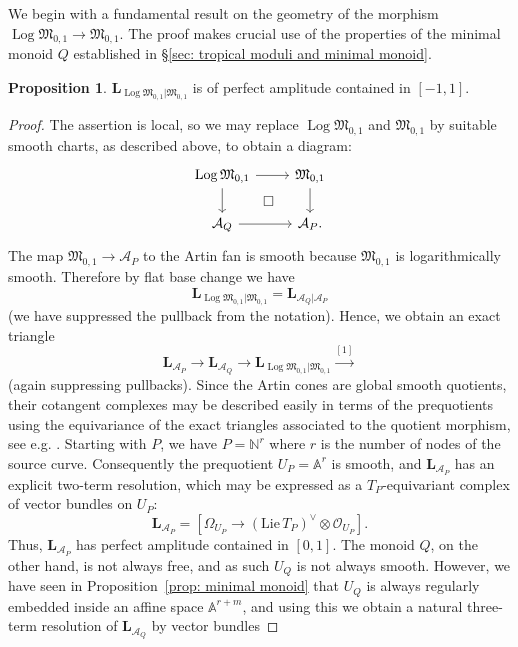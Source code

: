 \documentclass[11pt]{amsart}
\theoremstyle{definition}
\theoremstyle{definition}
\newtheorem{proposition}[theorem]{Proposition}
\newcommand{\LL}{\mathbf{L}}
\newcommand{\Aaff}{\mathbb{A}}
\newcommand{\OO}{\mathcal{O}}
\newcommand{\N}{\mathbb{N}}
\newcommand{\Acal}{\mathcal{A}}
\newcommand{\Mfrak}{\mathfrak{M}}
\newcommand{\Log}{\operatorname{Log}}
\begin{document}
We begin with a fundamental result on the geometry of the morphism $\Log\Mfrak_{0,1} \to \Mfrak_{0,1}$. The proof makes crucial use of the properties of the minimal monoid $Q$ established in \S \ref{sec: tropical moduli and minimal monoid}.

\begin{proposition} \label{prop: Lchi in -1,1} $\LL_{\Log\Mfrak_{0,1}|\Mfrak_{0,1}}$ is of perfect amplitude contained in $[-1,1]$.\end{proposition}
\begin{proof} The assertion is local, so we may replace $\Log\Mfrak_{0,1}$ and $\Mfrak_{0,1}$ by suitable smooth charts, as described above, to obtain a diagram:
\begin{equation}
\begin{tikzcd}
\Log\Mfrak_{0,1} \ar[r] \ar[d] \ar[rd,phantom,"\square"] & \Mfrak_{0,1} \ar[d] \\
\Acal_Q \ar[r] & \Acal_P.
\end{tikzcd}	
\end{equation}
The map $\Mfrak_{0,1} \to \Acal_P$ to the Artin fan is smooth because $\Mfrak_{0,1}$ is logarithmically smooth. Therefore by flat base change we have
$$\LL_{\Log\Mfrak_{0,1}|\Mfrak_{0,1}} = \LL_{\Acal_Q|\Acal_P}$$
(we have suppressed the pullback from the notation). Hence, we obtain an exact triangle
\begin{equation}\label{eqn: exact triangle for Lchi} \LL_{\Acal_P} \to \LL_{\Acal_Q} \to \LL_{\Log\Mfrak_{0,1}|\Mfrak_{0,1}} \xrightarrow{[1]}\end{equation}
(again suppressing pullbacks). Since the Artin cones are global smooth quotients, their cotangent complexes may be described easily in terms of the prequotients using the equivariance of the exact triangles associated to the quotient morphism, see e.g. \cite[p.4]{BehrendDeRham}. Starting with $P$, we have $P=\N^r$ where $r$ is the number of nodes of the source curve. Consequently the prequotient $U_P = \Aaff^r$ is smooth, and $\LL_{\Acal_P}$ has an explicit two-term resolution, which may be expressed as a $T_P$-equivariant complex of vector bundles on $U_P$:
\begin{equation*} \LL_{\Acal_P} = [ \Omega_{U_P} \to (\mathrm{Lie}\, T_P)^\vee \otimes \OO_{U_P} ].\end{equation*}
Thus, $\LL_{\Acal_P}$ has perfect amplitude contained in $[0,1]$. The monoid $Q$, on the other hand, is not always free, and as such $U_Q$ is not always smooth. However, we have seen in Proposition~\ref{prop: minimal monoid} that $U_Q$ is always regularly embedded inside an affine space $\Aaff^{r+m}$, and using this we obtain a natural three-term resolution of $\LL_{\Acal_Q}$ by vector bundles

\end{proof}
\end{document}
